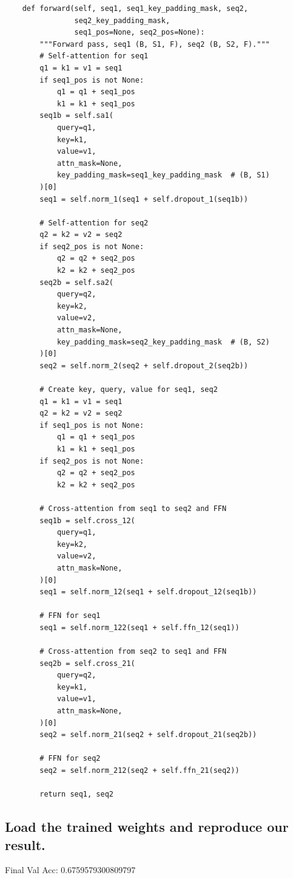 \documentclass{article}
\begin{document}
\begin{lstlisting}
    def forward(self, seq1, seq1_key_padding_mask, seq2,
                seq2_key_padding_mask,
                seq1_pos=None, seq2_pos=None):
        """Forward pass, seq1 (B, S1, F), seq2 (B, S2, F)."""
        # Self-attention for seq1
        q1 = k1 = v1 = seq1
        if seq1_pos is not None:
            q1 = q1 + seq1_pos
            k1 = k1 + seq1_pos
        seq1b = self.sa1(
            query=q1,
            key=k1,
            value=v1,
            attn_mask=None,
            key_padding_mask=seq1_key_padding_mask  # (B, S1)
        )[0]
        seq1 = self.norm_1(seq1 + self.dropout_1(seq1b))

        # Self-attention for seq2
        q2 = k2 = v2 = seq2
        if seq2_pos is not None:
            q2 = q2 + seq2_pos
            k2 = k2 + seq2_pos
        seq2b = self.sa2(
            query=q2,
            key=k2,
            value=v2,
            attn_mask=None,
            key_padding_mask=seq2_key_padding_mask  # (B, S2)
        )[0]
        seq2 = self.norm_2(seq2 + self.dropout_2(seq2b))

        # Create key, query, value for seq1, seq2
        q1 = k1 = v1 = seq1
        q2 = k2 = v2 = seq2
        if seq1_pos is not None:
            q1 = q1 + seq1_pos
            k1 = k1 + seq1_pos
        if seq2_pos is not None:
            q2 = q2 + seq2_pos
            k2 = k2 + seq2_pos

        # Cross-attention from seq1 to seq2 and FFN
        seq1b = self.cross_12(
            query=q1,
            key=k2,
            value=v2,
            attn_mask=None,
        )[0]
        seq1 = self.norm_12(seq1 + self.dropout_12(seq1b))

        # FFN for seq1
        seq1 = self.norm_122(seq1 + self.ffn_12(seq1))

        # Cross-attention from seq2 to seq1 and FFN
        seq2b = self.cross_21(
            query=q2,
            key=k1,
            value=v1,
            attn_mask=None,
        )[0]
        seq2 = self.norm_21(seq2 + self.dropout_21(seq2b))

        # FFN for seq2
        seq2 = self.norm_212(seq2 + self.ffn_21(seq2))

        return seq1, seq2
\end{lstlisting}

\subsection{Load the trained weights and reproduce our result.}
Final Val Acc: 0.6759579300809797
\end{document}
